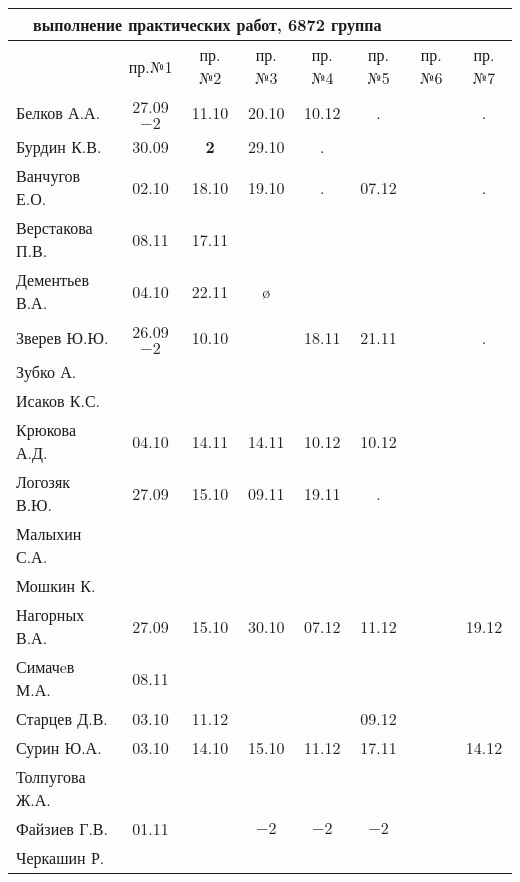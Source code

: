 \documentclass[a4paper,landscape,11pt]{article}
\begin{document}
\newpage
\begin{tabular}{l|ccccccc}
\multicolumn{6}{c}{выполнение практических работ, 6872 группа} \\
\toprule
	               & пр.№1   & пр.№2 &пр.№3&пр.№4&пр.№5&пр.№6&пр.№7\\
\midrule
	Белков А.А.    &27.09$-2$&11.10  &20.10&10.12&  .  &&.\\   
	Бурдин К.В.    &30.09    &{\bf 2}&29.10& .   &     &&\\
	Ванчугов Е.О.  &02.10    &18.10  &19.10& .   &07.12&&.\\
	Верстакова П.В.&08.11    &17.11  &     &     &     &&\\
	Дементьев В.А. &04.10    &22.11  & \o  &     &     &&\\
	Зверев Ю.Ю.    &26.09$-2$&10.10  &     &18.11&21.11&&.\\
	Зубко А.       &         &       &     &     &     &&\\
	Исаков К.С.    &         &       &     &     &     &&\\
	Крюкова А.Д.   &04.10    &14.11  &14.11&10.12&10.12&&\\
	Логозяк В.Ю.   &27.09    &15.10  &09.11&19.11&.    &&\\
	Малыхин С.А.   &         &       &     &     &     &&\\
	Мошкин К.      &         &       &     &     &     &&\\
	Нагорных В.А.  &27.09    &15.10  &30.10&07.12&11.12&&19.12\\
	Симачeв М.А.   &08.11    &       &     &     &     &&\\
	Старцев Д.В.   &03.10    &11.12  &     &     &09.12&&\\
	Сурин Ю.А.     &03.10    &14.10  &15.10&11.12&17.11&&14.12\\
	Толпугова Ж.А. &         &       &     &     &     &&\\
	Файзиев Г.В.   &01.11    &       & $-2$& $-2$& $-2$&&\\
	Черкашин Р.    &         &       &     &     &     &&\\
\bottomrule
\end{tabular}
\end{document}
